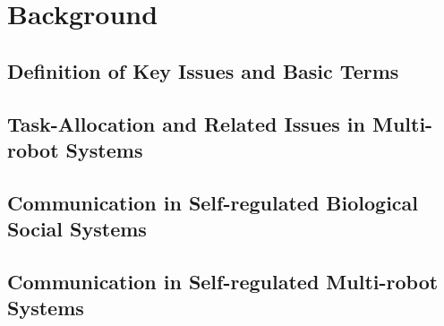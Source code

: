 \chapter{Background}
\section{Definition of Key Issues and Basic Terms}

\section{Task-Allocation and Related Issues in Multi-robot Systems}

\section{Communication in Self-regulated Biological Social Systems}

\section{Communication in Self-regulated Multi-robot Systems}

